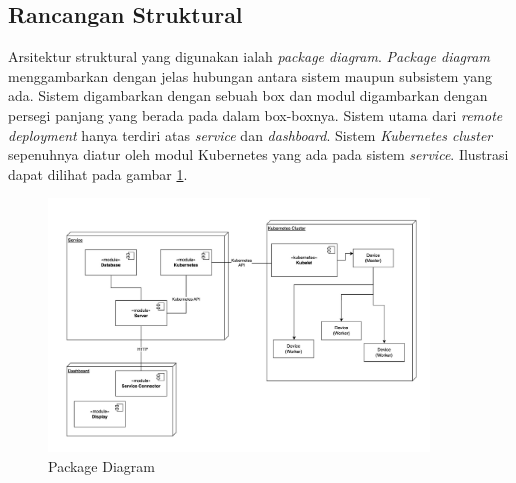\subsection{Rancangan Struktural}
\label{subsec:arsitektur-struktural}

Arsitektur struktural yang digunakan ialah \textit{package diagram}. \textit{Package diagram} menggambarkan dengan jelas hubungan antara sistem maupun subsistem yang ada. Sistem digambarkan dengan sebuah box dan modul digambarkan dengan persegi panjang yang berada pada dalam box-boxnya. Sistem utama dari \textit{remote deployment} hanya terdiri atas \textit{service} dan \textit{dashboard}. Sistem \textit{Kubernetes cluster} sepenuhnya diatur oleh modul Kubernetes yang ada pada sistem \textit{service}. Ilustrasi dapat dilihat pada gambar \ref{fig:package-diagram}.

\begin{figure}[ht]
  \centering
  \includegraphics[width=0.9\textwidth]{resources/chapter-3/package-diagram.jpg}
  \caption{Package Diagram}
  \label{fig:package-diagram}
\end{figure}

